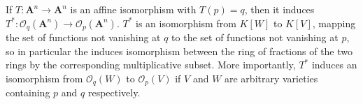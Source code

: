 If $T: \mathbf{A}^n \to \mathbf{A}^n$ is an affine isomorphism with $T(p) = q$, then it induces $T^*: \mathcal{O}_q(\mathbf{A}^n) \to \mathcal{O}_p(\mathbf{A}^n)$. $T^*$ is an isomorphism from $K[W]$ to $K[V]$, mapping the set of functions not vanishing at $q$ to the set of functions not vanishing at $p$, so in particular the induces isomorphism between the ring of fractions of the two rings by the corresponding multiplicative subset. More importantly, $T^*$ induces an isomorphism from $\mathcal{O}_q(W)$ to $\mathcal{O}_p(V)$ if $V$ and $W$ are arbitrary varieties containing $p$ and $q$ respectively.

